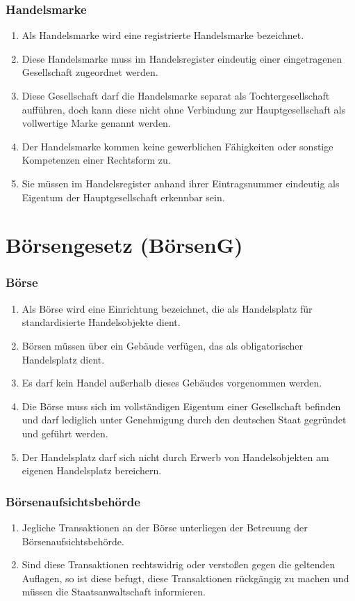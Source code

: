 \documentclass{article}
\begin{document}
\subsubsection{Handelsmarke}
\begin{enumerate}[(1)]
    \item Als Handelsmarke wird eine registrierte Handelsmarke bezeichnet.
    \item Diese Handelsmarke muss im Handelsregister eindeutig einer eingetragenen Gesellschaft zugeordnet werden.
    \item Diese Gesellschaft darf die Handelsmarke separat als Tochtergesellschaft aufführen, doch kann diese nicht ohne Verbindung zur Hauptgesellschaft als vollwertige Marke genannt werden.
    \item Der Handelsmarke kommen keine gewerblichen Fähigkeiten oder sonstige Kompetenzen einer Rechtsform zu.
    \item Sie müssen im Handelsregister anhand ihrer Eintragsnummer eindeutig als Eigentum der Hauptgesellschaft erkennbar sein.
\end{enumerate}

\newpage

\section{Börsengesetz (BörsenG)}
\localtableofcontents
\subsubsection{Börse}
\begin{enumerate}[(1)]
    \item Als Börse wird eine Einrichtung bezeichnet, die als Handelsplatz für standardisierte Handelsobjekte dient.
    \item Börsen müssen über ein Gebäude verfügen, das als obligatorischer Handelsplatz dient.
    \item Es darf kein Handel außerhalb dieses Gebäudes vorgenommen werden.
    \item Die Börse muss sich im vollständigen Eigentum einer Gesellschaft befinden und darf lediglich unter Genehmigung durch den deutschen Staat gegründet und geführt werden.
    \item Der Handelsplatz darf sich nicht durch Erwerb von Handelsobjekten am eigenen Handelsplatz bereichern.
\end{enumerate}

\subsubsection{Börsenaufsichtsbehörde}
\begin{enumerate}[(1)]
    \item Jegliche Transaktionen an der Börse unterliegen der Betreuung der Börsenaufsichtsbehörde.
    \item Sind diese Transaktionen rechtswidrig oder verstoßen gegen die geltenden Auflagen, so ist diese befugt, diese Transaktionen rückgängig zu machen und müssen die Staatsanwaltschaft informieren.
\end{enumerate}
\end{document}
